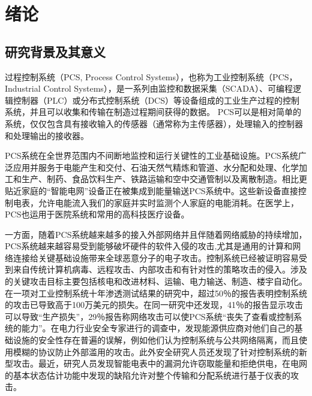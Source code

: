

\chapter{绪论}
\label{chap:intro}

\section{研究背景及其意义}

过程控制系统（PCS, Process Control Systems），也称为工业控制系统（PCS，Industrial Control Systems），是一系列由监控和数据采集（SCADA）、可编程逻辑控制器（PLC）或分布式控制系统（DCS）等设备组成的工业生产过程的控制系统，并且可以收集和传输在制造过程期间获得的数据。 PCS可以是相对简单的系统，仅仅包含具有接收输入的传感器（通常称为主传感器），处理输入的控制器和处理输出的接收器。

PCS系统在全世界范围内不间断地监控和运行关键性的工业基础设施。PCS系统广泛应用并服务于电能产生和交付、石油天然气精炼和管道、水分配和处理、化学加工和生产、制药、食品饮料生产、铁路运输和空中交通管制以及离散制造\parencite{Stouffer11,Weiss10,Hentea08}。相比更贴近家庭的“智能电网”设备正在被集成到能量输送PCS系统中。这些新设备直接控制电表，允许电能流入我们的家庭并实时监测个人家庭的电能消耗。在医学上，PCS也运用于医院系统和常用的高科技医疗设备。

一方面，随着PCS系统越来越多的接入外部网络并且伴随着网络威胁的持续增加，PCS系统越来越容易受到能够破坏硬件的软件入侵的攻击,尤其是通用的计算和网络连接给关键基础设施带来全球恶意分子的电子攻击。控制系统已经被证明容易受到来自传统计算机病毒\parencite{Roberts08,Krebs08}、远程攻击\parencite{Grad10}、内部攻击\parencite{Leall09}和有针对性的策略攻击\parencite{Zetter10}的侵入。涉及的关键攻击目标主要包括核电和改进材料\parencite{Krebs08,Leyden08}、运输\parencite{Grad10}、电力输送\parencite{Meserve07}、制造\parencite{Roberts08}、楼宇自动化\parencite{Leall09}。
在一项对工业控制系统十年渗透测试结果的研究中，超过50％的报告表明控制系统的攻击已导致高于100万美元的损失\parencite{Byres03}。在同一研究中还发现，41％的报告显示攻击可以导致“生产损失”，29％报告称网络攻击可以使PCS系统“丧失了查看或控制系统的能力”。在电力行业安全专家进行的调查中，发现能源供应商对他们自己的基础设施的安全性存在普遍的误解，例如他们认为控制系统与公共网络隔离，而且使用模糊的协议防止外部滥用的攻击\parencite{1Pietre11}。此外安全研究人员还发现了针对控制系统的新型攻击。最近，研究人员发现智能电表中的漏洞允许窃取能量和拒绝供电\parencite{1McLaughlin09,1McLaughlin10}，在电网的基本状态估计功能中发现的缺陷允许对整个传输和分配系统进行基于仪表的攻击\parencite{1Liu09}。

